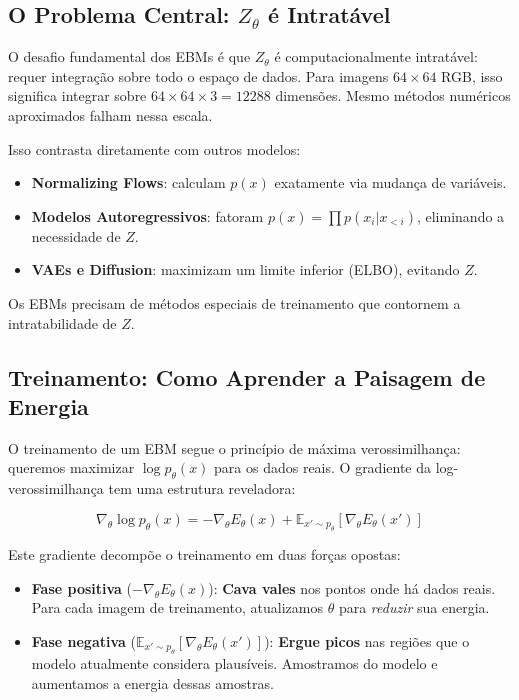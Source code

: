 \documentclass{tufte-handout}
\let\subsubsection\subsection
\begin{document}
\subsubsection{O Problema Central: $Z_\theta$ é Intratável}

O desafio fundamental dos EBMs é que $Z_\theta$ é computacionalmente intratável: requer integração sobre todo o espaço de dados. Para imagens $64 \times 64$ RGB, isso significa integrar sobre $64 \times 64 \times 3 = 12288$ dimensões. Mesmo métodos numéricos aproximados falham nessa escala.

Isso contrasta diretamente com outros modelos:
\begin{itemize}
    \item \textbf{Normalizing Flows}: calculam $p(x)$ exatamente via mudança de variáveis.
    \item \textbf{Modelos Autoregressivos}: fatoram $p(x) = \prod p(x_i | x_{<i})$, eliminando a necessidade de $Z$.
    \item \textbf{VAEs e Diffusion}: maximizam um limite inferior (ELBO), evitando $Z$.
\end{itemize}
Os EBMs precisam de métodos especiais de treinamento que contornem a intratabilidade de $Z$.

\subsection{Treinamento: Como Aprender a Paisagem de Energia}

O treinamento de um EBM segue o princípio de máxima verossimilhança: queremos maximizar $\log p_\theta(x)$ para os dados reais. O gradiente da log-verossimilhança tem uma estrutura reveladora:

\begin{equation}
\nabla_\theta \log p_\theta(x) = -\nabla_\theta E_\theta(x) + \mathbb{E}_{x' \sim p_\theta} \left[ \nabla_\theta E_\theta(x') \right]
\end{equation}

Este gradiente decompõe o treinamento em duas forças opostas:

\begin{itemize}
    \item \textbf{Fase positiva} ($-\nabla_\theta E_\theta(x)$): \textbf{Cava vales} nos pontos onde há dados reais. Para cada imagem de treinamento, atualizamos $\theta$ para \textit{reduzir} sua energia.
    \item \textbf{Fase negativa} ($\mathbb{E}_{x' \sim p_\theta} [\nabla_\theta E_\theta(x')]$): \textbf{Ergue picos} nas regiões que o modelo atualmente considera plausíveis. Amostramos do modelo e aumentamos a energia dessas amostras.
\end{itemize}
\end{document}
